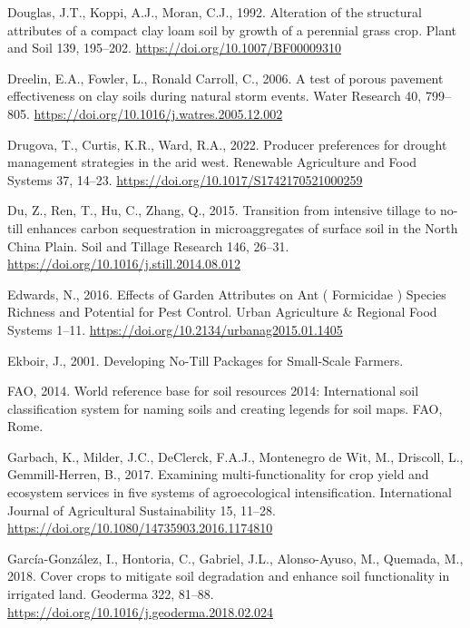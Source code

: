 \documentclass[
  12pt,
]{article}
\newlength{\cslhangindent}
\newlength{\cslentryspacingunit} %
\newenvironment{CSLReferences}[2] %
 {%
  \setlength{\parindent}{0pt}
  \ifodd #1
  \let\oldpar\par
  \def\par{\hangindent=\cslhangindent\oldpar}
  \fi
  \setlength{\parskip}{#2\cslentryspacingunit}
 }%
 {}
\begin{document}
\begin{CSLReferences}{1}{0}
\leavevmode{}%
Douglas, J.T., Koppi, A.J., Moran, C.J., 1992. Alteration of the structural attributes of a compact clay loam soil by growth of a perennial grass crop. Plant and Soil 139, 195--202. \url{https://doi.org/10.1007/BF00009310}

\leavevmode{}%
Dreelin, E.A., Fowler, L., Ronald Carroll, C., 2006. A test of porous pavement effectiveness on clay soils during natural storm events. Water Research 40, 799--805. \url{https://doi.org/10.1016/j.watres.2005.12.002}

\leavevmode{}%
Drugova, T., Curtis, K.R., Ward, R.A., 2022. Producer preferences for drought management strategies in the arid west. Renewable Agriculture and Food Systems 37, 14--23. \url{https://doi.org/10.1017/S1742170521000259}

\leavevmode{}%
Du, Z., Ren, T., Hu, C., Zhang, Q., 2015. Transition from intensive tillage to no-till enhances carbon sequestration in microaggregates of surface soil in the {North China Plain}. Soil and Tillage Research 146, 26--31. \url{https://doi.org/10.1016/j.still.2014.08.012}

\leavevmode{}%
Edwards, N., 2016. Effects of {Garden Attributes} on {Ant} ( {Formicidae} ) {Species Richness} and {Potential} for {Pest Control}. Urban Agriculture \& Regional Food Systems 1--11. \url{https://doi.org/10.2134/urbanag2015.01.1405}

\leavevmode{}%
Ekboir, J., 2001. Developing {No-Till Packages} for {Small-Scale Farmers}.

\leavevmode{}%
FAO, 2014. World reference base for soil resources 2014: International soil classification system for naming soils and creating legends for soil maps. {FAO}, {Rome}.

\leavevmode{}%
Garbach, K., Milder, J.C., DeClerck, F.A.J., Montenegro de Wit, M., Driscoll, L., Gemmill-Herren, B., 2017. Examining multi-functionality for crop yield and ecosystem services in five systems of agroecological intensification. International Journal of Agricultural Sustainability 15, 11--28. \url{https://doi.org/10.1080/14735903.2016.1174810}

\leavevmode{}%
García-González, I., Hontoria, C., Gabriel, J.L., Alonso-Ayuso, M., Quemada, M., 2018. Cover crops to mitigate soil degradation and enhance soil functionality in irrigated land. Geoderma 322, 81--88. \url{https://doi.org/10.1016/j.geoderma.2018.02.024}


\end{CSLReferences}
\end{document}
